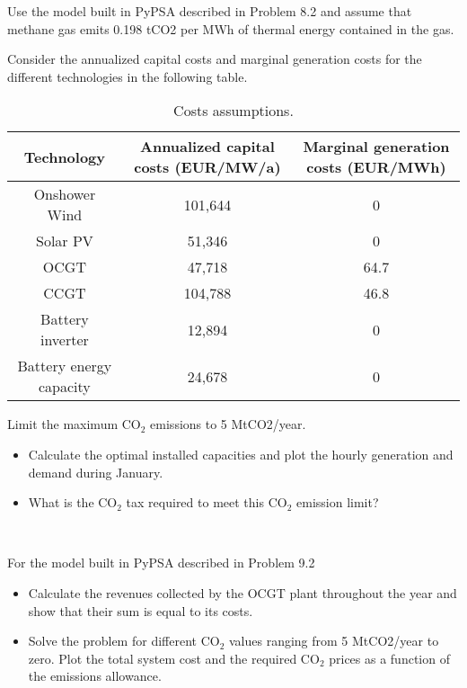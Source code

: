 \documentclass[10pt]{article}
\newenvironment{problem}[2][Problem]{\begin{trivlist}
\item[\hskip \labelsep {\bfseries #1}\hskip \labelsep {\bfseries #2.}]}{\end{trivlist}}
\begin{document}
\begin{problem}{9.2}
Use the model built in PyPSA described in Problem 8.2 and assume that methane gas emits 0.198 tCO2 per MWh of thermal energy contained in the gas. 

Consider the annualized capital costs and marginal generation costs for the different technologies in the following table.

\begin{table}[h]
    \centering
    \begin{tabular}{|c|c|c|}
    \hline
        Technology & Annualized capital costs (EUR/MW/a) & Marginal generation costs (EUR/MWh) \\
    \hline
    Onshower Wind &  101,644 & 0 \\
         Solar PV &  51,346 & 0 \\
         OCGT & 47,718 &  64.7  \\
         CCGT & 104,788 &  46.8   \\
         Battery inverter & 12,894  & 0 \\
         Battery energy capacity &  24,678 & 0 \\
    \hline
    \end{tabular}
    \caption{Costs assumptions.}
    \label{tab:my_label}
\end{table}

Limit the maximum CO$_2$ emissions to 5 MtCO2/year. 

\begin{itemize}
\item[a)] Calculate the optimal installed capacities and plot the hourly generation and demand during January.
\item[b)] What is the CO$_2$ tax required to meet this CO$_2$ emission limit?

\end{itemize}

\end{problem}

\

\begin{problem}{9.3}

For the model built in PyPSA described in Problem 9.2

\begin{itemize}
\item[a)] Calculate the revenues collected by the OCGT plant throughout the year and show that their sum is equal to its costs.
\item[b)] Solve the problem for different CO$_2$ values ranging from 5 MtCO2/year to zero. Plot the total system cost and the required CO$_2$ prices as a function of the emissions allowance.
\end{itemize}

\end{problem}

\end{document}
